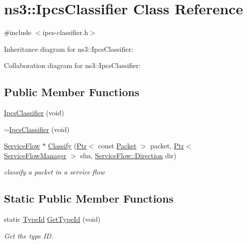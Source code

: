 \hypertarget{classns3_1_1IpcsClassifier}{}\section{ns3\+:\+:Ipcs\+Classifier Class Reference}
\label{classns3_1_1IpcsClassifier}


{\ttfamily \#include $<$ipcs-\/classifier.\+h$>$}



Inheritance diagram for ns3\+:\+:Ipcs\+Classifier\+:


Collaboration diagram for ns3\+:\+:Ipcs\+Classifier\+:
\subsection*{Public Member Functions}
\begin{DoxyCompactItemize}
\item 
\hyperlink{classns3_1_1IpcsClassifier_ab35fb60fa2b310acbed40b2f82190cc7}{Ipcs\+Classifier} (void)
\item 
\hyperlink{classns3_1_1IpcsClassifier_a47fe9396127e37ac82fd75ba06171d8a}{$\sim$\+Ipcs\+Classifier} (void)
\item 
\hyperlink{classns3_1_1ServiceFlow}{Service\+Flow} $\ast$ \hyperlink{classns3_1_1IpcsClassifier_a76830e1aad5ca23c103951ca4a0c7aa5}{Classify} (\hyperlink{classns3_1_1Ptr}{Ptr}$<$ const \hyperlink{classns3_1_1Packet}{Packet} $>$ packet, \hyperlink{classns3_1_1Ptr}{Ptr}$<$ \hyperlink{classns3_1_1ServiceFlowManager}{Service\+Flow\+Manager} $>$ sfm, \hyperlink{classns3_1_1ServiceFlow_ae14b8dc8bb371bad10fe078110655d4f}{Service\+Flow\+::\+Direction} dir)
\begin{DoxyCompactList}\small\item\em classify a packet in a service flow \end{DoxyCompactList}\end{DoxyCompactItemize}
\subsection*{Static Public Member Functions}
\begin{DoxyCompactItemize}
\item 
static \hyperlink{classns3_1_1TypeId}{Type\+Id} \hyperlink{classns3_1_1IpcsClassifier_a328e31294a2813c7cecc4f203a8dba78}{Get\+Type\+Id} (void)
\begin{DoxyCompactList}\small\item\em Get the type ID. \end{DoxyCompactList}\end{DoxyCompactItemize}
